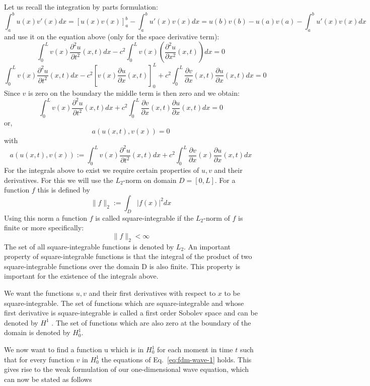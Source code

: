 Let us recall the integration by parts formulation:
\[
\int_a^b u(x) v'(x) dx 
= [ u(x)v(x) ]_a^b  - \int_a^b u'(x) v(x) dx
= u(b)v(b)-u(a)v(a)  - \int_a^b u'(x) v(x) dx
\]
and use it on the equation above (only for the space derivative term):
\[
\int_0^L  v(x)  \frac{\partial^2 u}{\partial t^2}(x,t)  dx
- c^2 \int_0^L  v(x) \left(  \frac{\partial^2 u}{\partial x^2}(x,t)\right) dx =0
\]
\[
\int_0^L  v(x)  \frac{\partial^2 u}{\partial t^2}(x,t)  dx
- c^2 \left[ v(x)  \frac{\partial u}{\partial x}(x,t) \right]_0^ L
+c^2 \int_0^L  \frac{\partial v}{\partial x}(x,t)  \frac{\partial u}{\partial x}(x,t)  dx =0
\]
Since $v$ is zero on the boundary the middle term is then zero and we obtain:
\begin{equation}
\int_0^L  v(x)  \frac{\partial^2 u}{\partial t^2}(x,t)  dx
+c^2 \int_0^L  \frac{\partial v}{\partial x}(x,t)  \frac{\partial u}{\partial x}(x,t)  dx =0
\label{eq:fdm-wave-1}
\end{equation}
or, 
\[
a(u(x,t),v(x))=0
\]
with 
\begin{equation}
a(u(x,t),v(x)):=\int_0^L  v(x)  \frac{\partial^2 u}{\partial t^2}(x,t)  dx
+c^2 \int_0^L  \frac{\partial v}{\partial x}(x)  \frac{\partial u}{\partial x}(x,t)  dx
\label{eq:fdm-wave-aaa}
\end{equation}
For the integrals above to exist we require certain properties of $u,v$ and their derivatives.
For this we will use the $L_2$-norm on domain $D=[0,L]$. 
For a function $f$ this is defined by
\[
\| f \|_2 := \int_D  |f(x)|^2 dx 
\]
Using this norm a function $f$ is called square-integrable if the $L_2$-norm of $f$ 
is finite or more specifically:
\[
\|f\|_2 < \infty
\]
The set of all square-integrable functions is denoted by $L_2$. An important property of square-integrable
functions is that the integral of the product of two square-integrable functions over the domain D is also
finite. This property is important for the existence of the integrals above.

We want the functions $u,v$ and their first derivatives with respect to $x$ to be square-integrable. 
The set of functions which are square-integrable and whose first derivative is square-integrable 
is called a first order Sobolev space and can be denoted by $H^1$ . 
The set of functions which are also zero at the boundary of the domain is denoted by $H_0^1$.

We now want to find a function u which is in $H_0^1$ for each moment in time $t$ such that for every function $v$ in $H_0^1$ the equations of Eq.~\eqref{eq:fdm-wave-1} holds.
This gives rise to the weak formulation of our one-dimensional wave equation, which can now be stated as
follows

